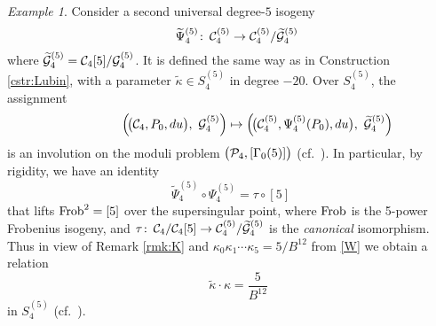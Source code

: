 \documentclass{gtpart}
\theoremstyle{definition}
\theoremstyle{remark}
\newtheorem{ex}[equation]{Example}
\def\co{\colon\thinspace}
\newcommand{\CC}{{\cal C}}
\newcommand{\CG}{{\cal G}}
\newcommand{\CP}{{\cal P}}
\newcommand{\Frob}{{\rm Frob}}
\newcommand{\G}{\Gamma}
\newcommand{\K}{\kappa}
\newcommand{\T}{\tau}
\renewcommand{\=}{\approx}
\renewcommand{\-}{\sim}
\numberwithin{equation}{section}
\begin{document}
\begin{ex}
 Consider a second universal degree-$5$ isogeny 
 \[
  \quad \widetilde{\Psi}_4^{(5)} \co \CC_4^{(5)} \to 
  \CC_4^{(5)} / \widetilde{\CG}_4^{(5)} 
 \]
 where $\widetilde{\CG}_4^{(5)} = \CC_4[5] / \CG_4^{(5)}$.  It is defined the 
 same way as in Construction \ref{cstr:Lubin}, with a parameter 
 $\widetilde{\K} \in S_4^{(5)}$ in degree $-20$.  Over $S_4^{(5)}$, the 
 assignment 
 \[
  \qquad\qquad~ \left(\! \big( \CC_4, P_0, du \big), ~ \CG_4^{(5)} \right) 
  \mapsto \left(\! \big( \CC_4^{(5)}, \Psi_4^{(5)}(P_0), du \big), 
  ~ \widetilde{\CG}_4^{(5)} \right) 
 \]
 is an involution on the moduli problem $\big(\CP_4,[\G_0(5)]\big)$ 
 (cf.~\cite[11.3.1]{KM}).  In particular, by rigidity, we have an identity 
 \[
  \widetilde{\Psi}_4^{(5)} \circ \Psi_4^{(5)} = \T \circ [5] 
 \]
 that lifts $\Frob^2 = [5]$ over the supersingular point, where $\Frob$ is the 
 5-power Frobenius isogeny, and 
 $\T \co \CC_4 / \CC_4[5] \to \CC_4^{(5)} / \widetilde{\CG}_4^{(5)}$ is the 
 {\em canonical} isomorphism.  Thus in view of Remark \ref{rmk:K} and 
 $\K_0 \K_1 \cdots \K_5 = 5 / B^{12}$ from \eqref{W} we obtain a relation 
 \[
  \quad~ \widetilde{\K} \cdot \K = \frac{5}{B^{12}} 
 \]
 in $S_4^{(5)}$ (cf.~\cite[proof of Corollary 3.2]{p3}).  


\end{ex}
\end{document}
